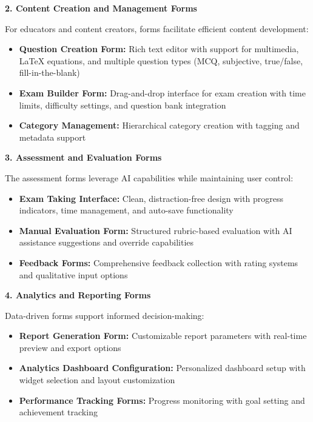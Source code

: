 \documentclass[12pt,a4paper,oneside]{book}
\begin{document}
\textbf{2. Content Creation and Management Forms}

For educators and content creators, forms facilitate efficient content development:

\begin{itemize}
    \item \textbf{Question Creation Form:} Rich text editor with support for multimedia, LaTeX equations, and multiple question types (MCQ, subjective, true/false, fill-in-the-blank)
    \item \textbf{Exam Builder Form:} Drag-and-drop interface for exam creation with time limits, difficulty settings, and question bank integration
    \item \textbf{Category Management:} Hierarchical category creation with tagging and metadata support
\end{itemize}

\textbf{3. Assessment and Evaluation Forms}

The assessment forms leverage AI capabilities while maintaining user control:

\begin{itemize}
    \item \textbf{Exam Taking Interface:} Clean, distraction-free design with progress indicators, time management, and auto-save functionality
    \item \textbf{Manual Evaluation Form:} Structured rubric-based evaluation with AI assistance suggestions and override capabilities
    \item \textbf{Feedback Forms:} Comprehensive feedback collection with rating systems and qualitative input options
\end{itemize}

\textbf{4. Analytics and Reporting Forms}

Data-driven forms support informed decision-making:

\begin{itemize}
    \item \textbf{Report Generation Form:} Customizable report parameters with real-time preview and export options
    \item \textbf{Analytics Dashboard Configuration:} Personalized dashboard setup with widget selection and layout customization
    \item \textbf{Performance Tracking Forms:} Progress monitoring with goal setting and achievement tracking
\end{itemize}
\end{document}
